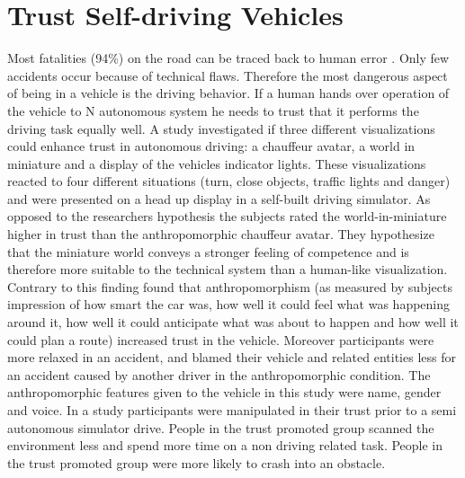 \section{Trust Self-driving Vehicles}\label{sec:trust}
Most fatalities (94\%) on the road can be traced back to human error \cite{Singh2015CriticalSurvey}. Only few accidents occur because of technical flaws. Therefore the most dangerous aspect of being in a vehicle is the driving behavior. If a human hands over operation of the vehicle to N autonomous system he needs to trust that it performs the driving task equally well. A study \cite{Hauslschmid2017}
investigated if three different visualizations could enhance trust in autonomous driving: a chauffeur avatar, a world in miniature and a display of the vehicles indicator lights. These visualizations reacted to four different situations (turn, close objects, traffic lights and danger) and were presented on a head up display in a self-built driving simulator. As opposed to the researchers hypothesis the subjects rated the world-in-miniature higher in trust than the anthropomorphic chauffeur avatar. They hypothesize that the miniature world conveys a
stronger feeling of competence and is therefore more suitable to the technical system than a human-like visualization. Contrary to this finding \cite{Waytz2014} found that anthropomorphism (as measured by subjects impression of how smart the car was, how well it could feel what was happening around it, how well it could anticipate what was about to happen and how well it could plan a route) increased trust in the vehicle. Moreover participants were more relaxed in an accident, and blamed their vehicle and related entities less for an accident caused by another driver in the anthropomorphic condition. The anthropomorphic features given to the vehicle in this study were name, gender and voice. In a study \cite{Korber2018} participants were manipulated in their trust prior to a semi autonomous simulator drive. People in the trust promoted group scanned the environment less and spend more time on a non driving related task. People in the trust promoted group were more likely to crash into an obstacle. 
